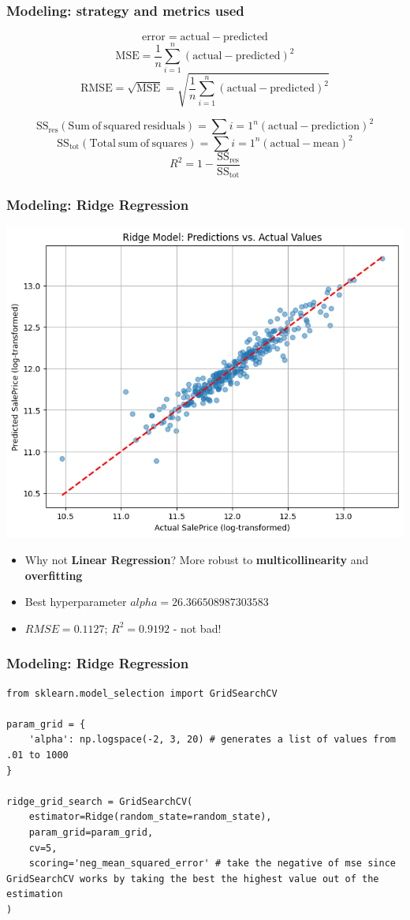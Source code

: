 \documentclass{beamer}
\begin{document}
\begin{frame}
\frametitle{Modeling: strategy and metrics used}

\footnotesize
$$\mathrm{error}=\mathrm{actual}-\mathrm{predicted}$$
$$\mathrm{MSE}=\frac{1}{n}\sum_{i=1}^{n}(\mathrm{actual}-\mathrm{predicted})^2$$
$$\mathrm{RMSE}=\sqrt{\mathrm{MSE}}=\sqrt{\frac{1}{n}\sum_{i=1}^{n}(\mathrm{actual}-\mathrm{predicted})^2}$$

$$\mathrm{SS}_{\mathrm{res}}(\mathrm{Sum\ of\ squared\ residuals})=\sum{i=1}^{n}(\mathrm{actual}-\mathrm{prediction})^2$$
$$\mathrm{SS}_{\mathrm{tot}}(\mathrm{Total\ sum\ of\ squares})=\sum{i=1}^{n}(\mathrm{actual}-\mathrm{mean})^2$$
$$R^2=1-\frac{\mathrm{SS}_{\mathrm{res}}}{\mathrm{SS}_{\mathrm{tot}}}$$
\normalsize
\end{frame}

\begin{frame}
\frametitle{Modeling: Ridge Regression}
\centering
    \includegraphics[width=.7\textwidth]{../challenge/main_files/main_45_0.png}

\begin{itemize}
    \item Why not \textbf{Linear Regression}? More robust to \textbf{multicollinearity} and \textbf{overfitting}
    \item Best hyperparameter $alpha=26.366508987303583$
    \item $RMSE = 0.1127$; $R^2 = 0.9192$ - not bad!
\end{itemize}
\end{frame}

\begin{frame}[fragile]
\frametitle{Modeling: Ridge Regression}

\begin{verbatim}
from sklearn.model_selection import GridSearchCV

param_grid = {
    'alpha': np.logspace(-2, 3, 20) # generates a list of values from .01 to 1000
}

ridge_grid_search = GridSearchCV(
    estimator=Ridge(random_state=random_state),
    param_grid=param_grid,
    cv=5,
    scoring='neg_mean_squared_error' # take the negative of mse since GridSearchCV works by taking the best the highest value out of the estimation
)
\end{verbatim}
\end{frame}
\end{document}
